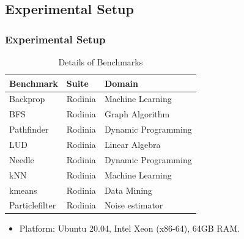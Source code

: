 \documentclass[
	12pt, %
]{beamer}
\begin{document}
\subsection{Experimental Setup}
\begin{frame}
	\frametitle{Experimental Setup}
	
	
	\begin{table}[h!]
		\centering
		\caption{Details of Benchmarks}
		\begin{tabular}{lll}
			\toprule
			\textbf{Benchmark} & \textbf{Suite} & \textbf{Domain} \\
			\midrule
			Backprop          & Rodinia        & Machine Learning       \\
			BFS               & Rodinia        & Graph Algorithm        \\
			Pathfinder        & Rodinia        & Dynamic Programming    \\
			LUD               & Rodinia        & Linear Algebra         \\
			Needle            & Rodinia        & Dynamic Programming    \\
			kNN               & Rodinia        & Machine Learning       \\
			kmeans            & Rodinia        & Data Mining            \\
			Particlefilter    & Rodinia        & Noise estimator        \\
			\bottomrule
		\end{tabular}
	\end{table}
	
	\begin{itemize}
		\item Platform: Ubuntu 20.04, Intel Xeon (x86-64), 64GB RAM.
	\end{itemize}
\end{frame}
\end{document}
